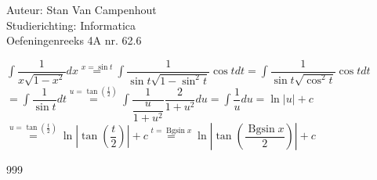 \documentclass[a4paper]{article}
\begin{document}
  
\noindent \large Auteur: Stan Van Campenhout \\
\noindent \large Studierichting:  Informatica\\
\noindent \large Oefeningenreeks 4A nr. 62.6\\

\medskip

\normalsize

$ \displaystyle\int\dfrac{1}{x\sqrt{1-x^2}}dx \stackrel{x = \sin t}{=} \displaystyle\int\dfrac{1}{\sin t\sqrt{1-\sin^2t}}\cos tdt
= \displaystyle\int\dfrac{1}{\sin t\sqrt{\cos^2t}}\cos tdt $\\

$ = \displaystyle\int\dfrac{1}{\sin t}dt \stackrel{u = \tan\left(\tfrac{t}{2}\right)}{=} \displaystyle\int\dfrac{1}{\dfrac{u}{1+u^2}}\dfrac{2}{1+u^2}du 
= \displaystyle\int\dfrac{1}{u}du = \ln|u| + c $\\

$ \stackrel{u = \tan\left(\tfrac{t}{2}\right)}{=} \ln\left| \tan\left(\dfrac{t}{2}\right)\right| + c 
\stackrel{t = \operatorname{Bgsin}x}{=} \ln\left|\tan\left(\dfrac{\operatorname{Bgsin}x}{2}\right)\right| + c $\\

\begin{thebibliography}{999}
\end{thebibliography}
\end{document}
